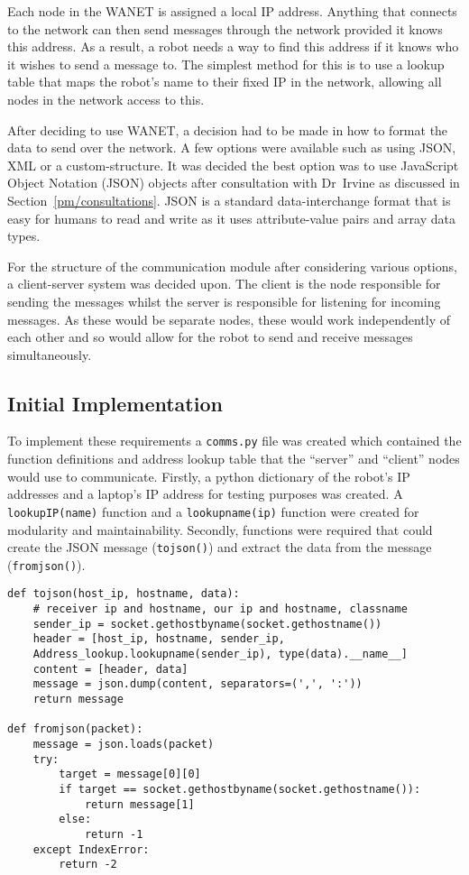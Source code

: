 Each node in the WANET is assigned a local IP address.
Anything that connects to the network can then send messages through
the network provided it knows this address. As a result, a robot
needs a way to find this address if it knows who it wishes to send
a message to. The simplest method for this is to use a lookup table
that maps the robot's name to their fixed IP in the network, allowing
all nodes in the network access to this.

After deciding to use WANET, a decision  had to be made in how to format
the data to send over the network. A few options were available such as
using JSON, XML or a custom-structure. It was decided the best option was
to use JavaScript Object Notation (JSON) objects after consultation with
Dr~Irvine as discussed in Section~\ref{pm/consultations}. JSON is a
standard data-interchange format that is easy for humans to read and write
as it uses attribute-value pairs and array data types.

For the structure of the communication module after considering various options,
a client-server system was decided upon. The client is the node
responsible for sending the messages whilst the server is responsible
for listening for incoming messages. As these would be separate nodes,
these would work independently of each other and so would allow for the
robot to send and receive messages simultaneously.

\subsection{Initial Implementation}\label{soft/comms/iniimpl}
To implement these requirements a \verb|comms.py| file was created which contained
the function definitions and address lookup table that the ``server'' and
``client'' nodes would use to communicate. Firstly, a python dictionary of the
robot's IP addresses and a laptop's IP address for testing purposes was created.
A \verb|lookupIP(name)| function and a \verb|lookupname(ip)| function were created for
modularity and maintainability. Secondly, functions were required that could
create the JSON message (\verb|tojson()|) and extract the data from
the message (\verb|fromjson()|).

\begin{lstlisting}
def tojson(host_ip, hostname, data):
    # receiver ip and hostname, our ip and hostname, classname
    sender_ip = socket.gethostbyname(socket.gethostname())
    header = [host_ip, hostname, sender_ip,
    Address_lookup.lookupname(sender_ip), type(data).__name__]
    content = [header, data]
    message = json.dump(content, separators=(',', ':'))
    return message

def fromjson(packet):
    message = json.loads(packet)
    try:
        target = message[0][0]
        if target == socket.gethostbyname(socket.gethostname()):
            return message[1]
        else:
            return -1
    except IndexError:
        return -2
\end{lstlisting}

